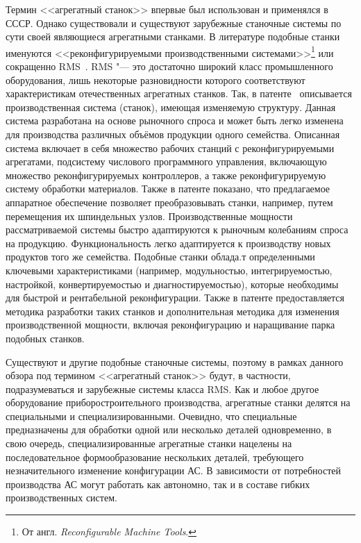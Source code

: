 Термин <<агрегатный станок>> впервые был использован и применялся в СССР. Однако существовали и существуют зарубежные станочные системы по сути своей являющиеся агрегатными станками. В литературе подобные станки именуются <<реконфигурируемыми производственными системами>>\footnote{От англ. \textit{Reconfigurable Machine Tools}.} или сокращенно RMS~\cite{lee1997reconfigurability, mehrabi2000}. RMS "--- это достаточно широкий класс промышленного оборудования, лишь некоторые разновидности которого соответствуют характеристикам отечественных агрегатных станков. Так, в патенте~\cite{US6349237} описывается производственная система (станок), имеющая изменяемую структуру. Данная система разработана на основе рыночного спроса и может быть легко изменена для производства различных объёмов продукции одного семейства. Описанная система включает в себя множество рабочих станций с реконфигурируемыми агрегатами, подсистему числового программного управления, включающую множество реконфигурируемых контроллеров, а также реконфигурируемую систему обработки материалов. Также в патенте показано, что предлагаемое аппаратное обеспечение позволяет преобразовывать станки, например, путем перемещения их шпиндельных узлов. Производственные мощности рассматриваемой системы быстро адаптируются к рыночным колебаниям спроса на продукцию. Функциональность легко адаптируется к производству новых продуктов того же семейства. Подобные станки облада.т определенными ключевыми характеристиками (например, модульностью, интегрируемостью, настройкой, конвертируемостью и диагностируемостью), которые необходимы для быстрой и рентабельной реконфигурации. Также в патенте предоставляется методика разработки таких станков и дополнительная методика для изменения производственной мощности, включая реконфигурацию и наращивание парка подобных станков. 

Существуют и другие подобные станочные системы, поэтому в рамках данного обзора под термином <<агрегатный станок>> будут, в частности, подразумеваться и зарубежные системы класса RMS. Как и любое другое оборудование приборостроительного производства, агрегатные станки делятся на специальными и специализированными. Очевидно, что специальные предназначены для обработки одной или несколько деталей одновременно, в свою очередь, специализированные агрегатные станки нацелены на последовательное формообразование нескольких деталей, требующего незначительного изменение конфигурации АС. В зависимости от потребностей производства АС могут работать как автономно, так и в составе гибких производственных систем.

